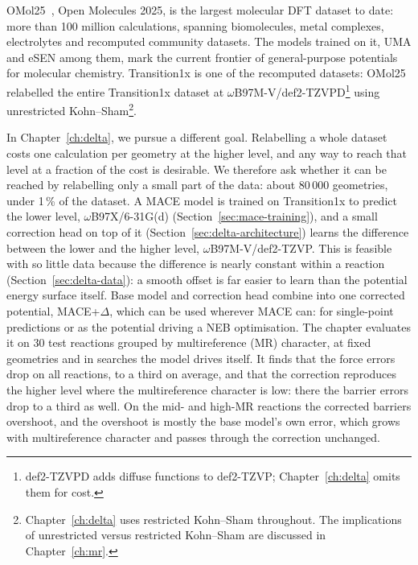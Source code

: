
OMol25~\cite{omol25}, Open Molecules 2025, is the largest molecular DFT
dataset to date: more than 100 million calculations, spanning
biomolecules, metal complexes, electrolytes and recomputed community
datasets. The models trained on it, UMA and eSEN among them, mark the
current frontier of general-purpose potentials for molecular chemistry.
Transition1x is one of the recomputed datasets: OMol25 relabelled the
entire Transition1x dataset at
\mbox{$\omega$B97M-V/def2-TZVPD}\footnote{def2-TZVPD adds diffuse
functions to def2-TZVP; Chapter~\ref{ch:delta} omits them for cost.} using
unrestricted Kohn--Sham\footnote{Chapter~\ref{ch:delta} uses restricted
Kohn--Sham throughout. The implications of unrestricted versus
restricted Kohn--Sham are discussed in Chapter~\ref{ch:mr}.}.

In Chapter~\ref{ch:delta}, we pursue a different goal. Relabelling a
whole dataset costs one calculation per geometry at the higher level,
and any way to reach that level at a fraction of the cost is
desirable. We therefore ask whether it can be reached by relabelling
only a small part of the data: about 80\,000 geometries, under 1\,\%
of the dataset. A MACE model is trained on Transition1x to predict the lower level,
\mbox{$\omega$B97X/6-31G(d)} (Section~\ref{sec:mace-training}), and
a small correction head on top of it
(Section~\ref{sec:delta-architecture}) learns the difference between
the lower and the higher level, \mbox{$\omega$B97M-V/def2-TZVP}. This is feasible with so little data because
the difference is nearly constant within a reaction
(Section~\ref{sec:delta-data}): a smooth offset is far easier to learn
than the potential energy surface itself. Base model and correction
head combine into one corrected potential, MACE+$\Delta$, which can be
used wherever MACE can: for single-point predictions or as the
potential driving a NEB optimisation. The chapter evaluates it on 30
test reactions grouped by multireference (MR) character, at fixed
geometries and in searches the model drives itself. It finds that the force errors drop on all reactions, to a third on average, and
that the correction reproduces the higher level where the
multireference character is low: there the barrier errors drop to a
third as well. On the mid- and high-MR reactions the corrected
barriers overshoot, and the overshoot is mostly the base model's own
error, which grows with multireference character and passes through
the correction unchanged.

